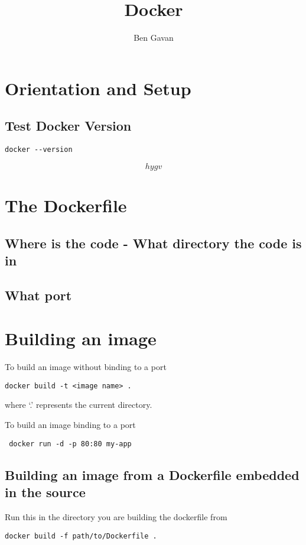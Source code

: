 \documentclass[]{article}
\title{Docker}
\author{Ben Gavan}
\newcommand{\<}{\guilsinglleft}
\renewcommand{\>}{\guilsinglright}
\begin{document}
\maketitle

\section{Orientation and Setup}

\subsection{Test Docker Version}
\begin{lstlisting}
docker --version
\end{lstlisting}

\begin{equation}
	hygv
\end{equation}

\section{The Dockerfile}
\subsection{Where is the code - What directory the code is in}

\subsection{What port}

\section{Building an image}
To build an image without binding to a port
\begin{lstlisting}
docker build -t <image name> .
\end{lstlisting}
where `.' represents the current directory.

To build an image binding to a port
\begin{lstlisting}
 docker run -d -p 80:80 my-app
\end{lstlisting}

\subsection{Building an image from a Dockerfile embedded in the source}
Run this in the directory you are building the dockerfile from
\begin{lstlisting}
docker build -f path/to/Dockerfile .
\end{lstlisting}
\end{document}
